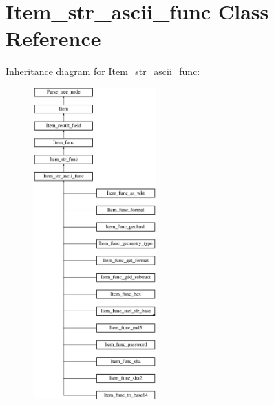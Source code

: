 \hypertarget{classItem__str__ascii__func}{}\section{Item\+\_\+str\+\_\+ascii\+\_\+func Class Reference}
\label{classItem__str__ascii__func}
Inheritance diagram for Item\+\_\+str\+\_\+ascii\+\_\+func\+:\begin{figure}[H]
\begin{center}
\leavevmode
\includegraphics[height=12.000000cm]{classItem__str__ascii__func}
\end{center}
\end{figure}
